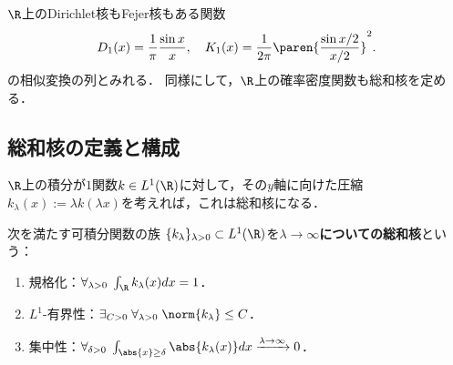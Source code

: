 \documentclass[uplatex,dvipdfmx]{jsreport}
\begin{document}
\begin{tcolorbox}[colframe=ForestGreen, colback=ForestGreen!10!white,breakable,colbacktitle=ForestGreen!40!white,coltitle=black,fonttitle=\bfseries\sffamily,
title=]
    $\R$上のDirichlet核もFejer核もある関数
    \[D_1(x)=\frac{1}{\pi}\frac{\sin x}{x},\quad K_1(x)=\frac{1}{2\pi}\paren{\frac{\sin x/2}{x/2}}^2.\]
    の相似変換の列とみれる．
    同様にして，$\R$上の確率密度関数も総和核を定める．
\end{tcolorbox}

\subsection{総和核の定義と構成}

\begin{tcolorbox}[colframe=ForestGreen, colback=ForestGreen!10!white,breakable,colbacktitle=ForestGreen!40!white,coltitle=black,fonttitle=\bfseries\sffamily,
title=]
    $\R$上の積分が$1$関数$k\in L^1(\R)$に対して，その$y$軸に向けた圧縮$k_\lambda(x):=\lambda k(\lambda x)$を考えれば，これは総和核になる．
\end{tcolorbox}

\begin{definition}
    次を満たす可積分関数の族
    $\{k_\lambda\}_{\lambda>0}\subset L^1(\R)$を\textbf{$\lambda\to\infty$についての総和核}という：
    \begin{enumerate}
        \item 規格化：$\forall_{\lambda>0}\;\int_\R k_\lambda(x)dx=1$．
        \item $L^1$-有界性：$\exists_{C>0}\;\forall_{\lambda>0}\;\norm{k_\lambda}\le C$．
        \item 集中性：$\forall_{\delta>0}\;\int_{\abs{x}\ge\delta}\abs{k_\lambda(x)}dx\xrightarrow{\lambda\to\infty}0$．
    \end{enumerate}
\end{definition}
\end{document}
